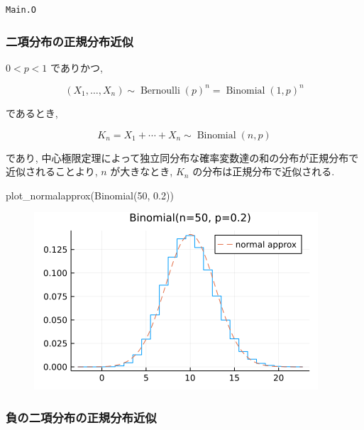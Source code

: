\documentclass[
  letterpaper,
  DIV=11,
  numbers=noendperiod]{scrartcl}
\newenvironment{Shaded}{\begin{snugshade}}{\end{snugshade}}
\newcommand{\FloatTok}[1]{\textcolor[rgb]{0.68,0.00,0.00}{#1}}
\newcommand{\FunctionTok}[1]{\textcolor[rgb]{0.28,0.35,0.67}{#1}}
\newcommand{\NormalTok}[1]{\textcolor[rgb]{0.00,0.23,0.31}{#1}}
\begin{document}
\begin{verbatim}
Main.O
\end{verbatim}

\hypertarget{ux4e8cux9805ux5206ux5e03ux306eux6b63ux898fux5206ux5e03ux8fd1ux4f3c}{%
\subsubsection{二項分布の正規分布近似}\label{ux4e8cux9805ux5206ux5e03ux306eux6b63ux898fux5206ux5e03ux8fd1ux4f3c}}

\(0 < p < 1\) でありかつ,

\[
(X_1,\ldots,X_n)\sim \operatorname{Bernoulli}(p)^n = \operatorname{Binomial}(1, p)^n
\]

であるとき,

\[
K_n = X_1 + \cdots + X_n \sim \operatorname{Binomial}(n, p)
\]

であり,
中心極限定理によって独立同分布な確率変数達の和の分布が正規分布で近似されることより,
\(n\) が大きなとき, \(K_n\) の分布は正規分布で近似される.

\begin{Shaded}
\begin{Highlighting}[]
\FunctionTok{plot\_normalapprox}\NormalTok{(}\FunctionTok{Binomial}\NormalTok{(}\FloatTok{50}\NormalTok{, }\FloatTok{0.2}\NormalTok{))}
\end{Highlighting}
\end{Shaded}

\begin{figure}[H]

{\centering \includegraphics{05 Central limit theorem_files/figure-pdf/cell-119-output-1.png}

}

\end{figure}

\hypertarget{ux8ca0ux306eux4e8cux9805ux5206ux5e03ux306eux6b63ux898fux5206ux5e03ux8fd1ux4f3c}{%
\subsubsection{負の二項分布の正規分布近似}\label{ux8ca0ux306eux4e8cux9805ux5206ux5e03ux306eux6b63ux898fux5206ux5e03ux8fd1ux4f3c}}
\end{document}

